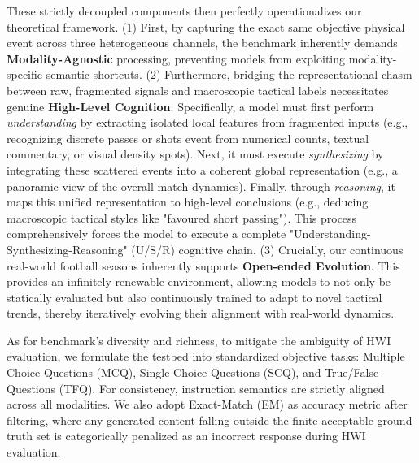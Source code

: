 These strictly decoupled components then perfectly operationalizes our theoretical framework. 
(1) First, by capturing the exact same objective physical event across three heterogeneous channels, the benchmark inherently demands \textbf{Modality-Agnostic} processing, preventing models from exploiting modality-specific semantic shortcuts. 
(2) Furthermore, bridging the representational chasm between raw, fragmented signals and macroscopic tactical labels necessitates genuine \textbf{High-Level Cognition}. Specifically, a model must first perform \textit{understanding} by extracting isolated local features from fragmented inputs (e.g., recognizing discrete passes or shots event from numerical counts, textual commentary, or visual density spots). Next, it must execute \textit{synthesizing} by integrating these scattered events into a coherent global representation (e.g., a panoramic view of the overall match dynamics). Finally, through \textit{reasoning}, it maps this unified representation to high-level conclusions (e.g., deducing macroscopic tactical styles like "favoured short passing"). This process comprehensively forces the model to execute a complete "Understanding-Synthesizing-Reasoning" (U/S/R) cognitive chain. 
(3) Crucially, our continuous real-world football seasons inherently supports \textbf{Open-ended Evolution}. This provides an infinitely renewable environment, allowing models to not only be statically evaluated but also continuously trained to adapt to novel tactical trends, thereby iteratively evolving their alignment with real-world dynamics. 


As for benchmark's diversity and richness, to mitigate the ambiguity of HWI evaluation, we formulate the testbed into standardized objective tasks: Multiple Choice Questions (MCQ), Single Choice Questions (SCQ), and True/False Questions (TFQ). For consistency, instruction semantics are strictly aligned across all modalities. We also adopt Exact-Match (EM) as accuracy metric after filtering, where any generated content falling outside the finite acceptable ground truth set is categorically penalized as an incorrect response during HWI evaluation.


